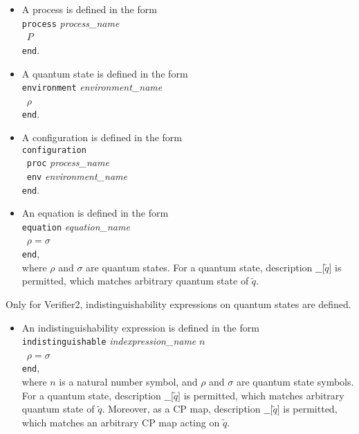 \begin{itemize}
\item A process is defined in the form\\
      {\tt process} {\it process\_name}\\
      ~$P$\\
      {\tt end}.
\item A quantum state is defined in the form\\
      {\tt environment} {\it environment\_name}\\
      ~$\rho$\\
      {\tt end}.
\item A configuration is defined in the form\\
      {\tt configuration}\\
      ~{\tt proc} {\it process\_name}\\
      ~{\tt env}  {\it environment\_name}\\
      {\tt end}.
\item An equation is defined in the form\\
      {\tt equation} {\it equation\_name}\\
      ~$\rho\mathrel{\texttt{=}}\sigma$\\
      {\tt end},\\
      where $\rho$ and $\sigma$ are quantum states. For a quantum
      state, description $\texttt{\_\_}\texttt{[}\tilde q\texttt{]}$ is
      permitted, which
      matches arbitrary quantum state of $\tilde q$.
\end{itemize}
Only for Verifier2, indistinguishability expressions
on quantum states are defined.
\begin{itemize}
 \item An indistinguishability expression is defined in the form\\
       {\tt indistinguishable} {\it indexpression\_name} $n$\\
       ~$\rho\mathrel{\texttt{=}}\sigma$\\
       {\tt end},\\
       where $n$ is a natural number symbol, and
       $\rho$ and $\sigma$ are quantum state symbols.
       For a quantum
       state, description $\texttt{\_\_}\texttt{[}\tilde q\texttt{]}$ is
       permitted, which
       matches arbitrary quantum state of $\tilde q$.
       Moreover, as a CP map, description
       $\texttt{\_\_}\texttt{[}\tilde q\texttt{]}$ is permitted,
       which matches an arbitrary CP map acting on $\tilde q$.
\end{itemize}


